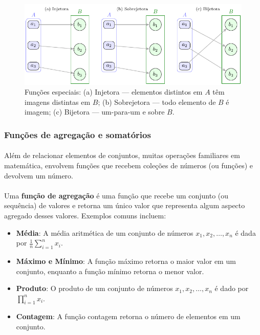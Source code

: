 \documentclass[12pt,a4paper]{article}
\def\emph#1{#1}%
\begin{document}
\begin{figure}[H]
    \centering
    \includegraphics[width=0.9\linewidth]{figures/fig_inj_sobre_bij.pdf}

    \caption{Funções especiais: (a) Injetora — elementos distintos em $A$ têm imagens distintas em $B$; (b) Sobrejetora — todo elemento de $B$ é imagem; (c) Bijetora — um-para-um e sobre $B$.}
    \label{fig:inj-sobre-bij}\end{figure}


\subsubsection{Funções de agregação e somatórios}

\paragraph{}
Além de relacionar elementos de conjuntos, muitas operações familiares em matemática, envolvem \emph{funções} que recebem coleções de números (ou funções) e devolvem um número.

\paragraph{}
Uma \textbf{função de agregação} é uma função que recebe um conjunto (ou sequência) de valores e retorna um único valor que representa algum aspecto agregado desses valores. Exemplos comuns incluem:
\begin{itemize}
    \item \textbf{Média}: A média aritmética de um conjunto de números \(x_1, x_2, \ldots, x_n\) é dada por \(\frac{1}{n}\sum_{i=1}^{n} x_i\).
    \item \textbf{Máximo e Mínimo}: A função máximo retorna o maior valor em um conjunto, enquanto a função mínimo retorna o menor valor.
    \item \textbf{Produto}: O produto de um conjunto de números \(x_1, x_2, \ldots, x_n\) é dado por \(\prod_{i=1}^{n} x_i\).
    \item \textbf{Contagem}: A função contagem retorna o número de elementos em um conjunto.
\end{itemize}
\end{document}
